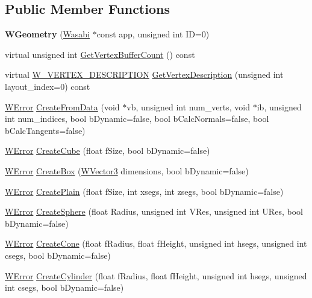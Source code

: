 \subsection*{Public Member Functions}
\begin{DoxyCompactItemize}
\item 
{\bfseries W\+Geometry} (\hyperlink{class_wasabi}{Wasabi} $\ast$const app, unsigned int ID=0)\hypertarget{class_w_geometry_a5bd75d5b0a5d557a09fd6565ea709fa1}{}\label{class_w_geometry_a5bd75d5b0a5d557a09fd6565ea709fa1}

\item 
virtual unsigned int \hyperlink{class_w_geometry_a4eab34844955ef4583d393c3304d250c}{Get\+Vertex\+Buffer\+Count} () const 
\item 
virtual \hyperlink{struct_w___v_e_r_t_e_x___d_e_s_c_r_i_p_t_i_o_n}{W\+\_\+\+V\+E\+R\+T\+E\+X\+\_\+\+D\+E\+S\+C\+R\+I\+P\+T\+I\+ON} \hyperlink{class_w_geometry_a84409cef0ba8228b571f4f69cdfd6131}{Get\+Vertex\+Description} (unsigned int layout\+\_\+index=0) const 
\item 
\hyperlink{class_w_error}{W\+Error} \hyperlink{class_w_geometry_ae9c73db37d16327132921df70669c6a4}{Create\+From\+Data} (void $\ast$vb, unsigned int num\+\_\+verts, void $\ast$ib, unsigned int num\+\_\+indices, bool b\+Dynamic=false, bool b\+Calc\+Normals=false, bool b\+Calc\+Tangents=false)
\item 
\hyperlink{class_w_error}{W\+Error} \hyperlink{class_w_geometry_a72d2e175081e0c3545497c621b8e4c95}{Create\+Cube} (float f\+Size, bool b\+Dynamic=false)
\item 
\hyperlink{class_w_error}{W\+Error} \hyperlink{class_w_geometry_a26ded3a7e2db75d132857d608e914bb0}{Create\+Box} (\hyperlink{class_w_vector3}{W\+Vector3} dimensions, bool b\+Dynamic=false)
\item 
\hyperlink{class_w_error}{W\+Error} \hyperlink{class_w_geometry_adeb899c32ca3f634dfccf7ba9780a3b3}{Create\+Plain} (float f\+Size, int xsegs, int zsegs, bool b\+Dynamic=false)
\item 
\hyperlink{class_w_error}{W\+Error} \hyperlink{class_w_geometry_a2a1d9a7ca9310f4e024250c33ace1dec}{Create\+Sphere} (float Radius, unsigned int V\+Res, unsigned int U\+Res, bool b\+Dynamic=false)
\item 
\hyperlink{class_w_error}{W\+Error} \hyperlink{class_w_geometry_a650d1bb17b2347329430925cc5e4aa86}{Create\+Cone} (float f\+Radius, float f\+Height, unsigned int hsegs, unsigned int csegs, bool b\+Dynamic=false)
\item 
\hyperlink{class_w_error}{W\+Error} \hyperlink{class_w_geometry_a312684c5e5f15629065c0e64fb8d121d}{Create\+Cylinder} (float f\+Radius, float f\+Height, unsigned int hsegs, unsigned int csegs, bool b\+Dynamic=false)

\end{DoxyCompactItemize}
